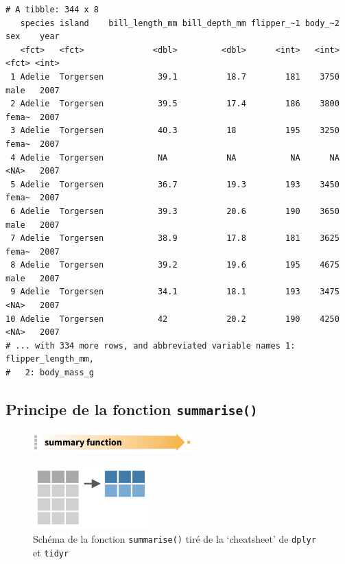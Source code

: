 \documentclass[
  a4paper,
  DIV=11,
  numbers=noendperiod,
  oneside]{scrreprt}
\begin{document}
\begin{verbatim}
# A tibble: 344 x 8
   species island    bill_length_mm bill_depth_mm flipper_~1 body_~2 sex    year
   <fct>   <fct>              <dbl>         <dbl>      <int>   <int> <fct> <int>
 1 Adelie  Torgersen           39.1          18.7        181    3750 male   2007
 2 Adelie  Torgersen           39.5          17.4        186    3800 fema~  2007
 3 Adelie  Torgersen           40.3          18          195    3250 fema~  2007
 4 Adelie  Torgersen           NA            NA           NA      NA <NA>   2007
 5 Adelie  Torgersen           36.7          19.3        193    3450 fema~  2007
 6 Adelie  Torgersen           39.3          20.6        190    3650 male   2007
 7 Adelie  Torgersen           38.9          17.8        181    3625 fema~  2007
 8 Adelie  Torgersen           39.2          19.6        195    4675 male   2007
 9 Adelie  Torgersen           34.1          18.1        193    3475 <NA>   2007
10 Adelie  Torgersen           42            20.2        190    4250 <NA>   2007
# ... with 334 more rows, and abbreviated variable names 1: flipper_length_mm,
#   2: body_mass_g
\end{verbatim}

\hypertarget{principe-de-la-fonction-summarise}{%
\subsection{\texorpdfstring{Principe de la fonction
\texttt{summarise()}}{Principe de la fonction summarise()}}\label{principe-de-la-fonction-summarise}}

\begin{figure}

{\centering \includegraphics[width=0.55\textwidth,height=\textheight]{./images/summarizearrow.png}

}

\end{figure}

\begin{figure}

{\centering \includegraphics[width=0.4\textwidth,height=\textheight]{./images/summarize.png}

}

\caption{\label{fig-summarise2}Schéma de la fonction
\texttt{summarise()} tiré de la `cheatsheet' de \texttt{dplyr} et
\texttt{tidyr}}

\end{figure}
\end{document}
